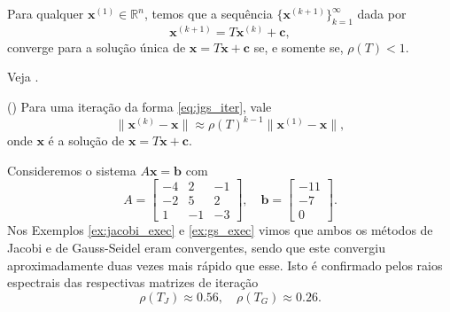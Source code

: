 \begin{teo}
  Para qualquer $\pmb{x}^{(1)}\in\mathbb{R}^n$, temos que a sequência $\{\pmb{x}^{(k+1)}\}_{k=1}^{\infty}$ dada por
  \begin{equation}
    \pmb{x}^{(k+1)} = T\pmb{x}^{(k)} + \pmb{c},
  \end{equation}
  converge para a solução única de $\pmb{x} = T\pmb{x} + \pmb{c}$ se, e somente se, $\rho(T) < 1$.
\end{teo}
\begin{dem}
  Veja \cite[Cap. 7, Sec. 7.3]{Burden2015a}.
\end{dem}

\begin{obs}()
  Para uma iteração da forma \eqref{eq:jgs_iter}, vale
  \begin{equation}
    \|\pmb{x}^{(k)}-\pmb{x}\| \approx \rho(T)^{k-1}\|\pmb{x}^{(1)}-\pmb{x}\|,
  \end{equation}
onde $\pmb{x}$ é a solução de $\pmb{x} = T\pmb{x} + \pmb{c}$.
\end{obs}

\begin{ex}\label{ex:jacobi_exec}
  Consideremos o sistema $A\pmb{x} = \pmb{b}$ com
  \begin{equation}
    A =
    \begin{bmatrix}
      -4 & 2 & -1 \\
      -2 & 5 & 2 \\
       1 & -1 & -3
    \end{bmatrix},\quad
    \pmb{b} =
    \begin{bmatrix}
      -11\\ -7\\ 0
    \end{bmatrix}.
  \end{equation}
  Nos Exemplos \ref{ex:jacobi_exec} e \ref{ex:gs_exec} vimos que ambos os métodos de Jacobi e de Gauss-Seidel eram convergentes, sendo que este convergiu aproximadamente duas vezes mais rápido que esse. Isto é confirmado pelos raios espectrais das respectivas matrizes de iteração
  \begin{equation}
    \rho(T_J) \approx 0.56,\quad\rho(T_G) \approx 0.26.
  \end{equation}

% 
\end{ex}

